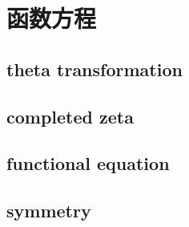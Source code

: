 \section{函数方程}
\label{b3:sec:2604}


\subsection{theta transformation}
\label{b3:subsec:260401}

\subsection{completed zeta}
\label{b3:subsec:260402}

\subsection{functional equation}
\label{b3:subsec:260403}

\subsection{symmetry}
\label{b3:subsec:260404}


